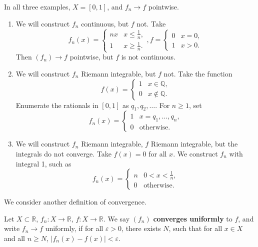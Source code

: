 \documentclass[12pt]{article}
\begin{document}
\begin{exbox}
	In all three examples, $X = [0,1]$, and $f_n \to f$ pointwise.
	\begin{enumerate}[1.]
		\item We will construct $f_n$ continuous, but $f$ not. Take
			\[
				f_n(x) =
				\begin{cases}
					nx & x \leq \frac{1}{n}, \\
					1 & x \geq \frac{1}{n}.
				\end{cases},
				f =
				\begin{cases}
					0 & x = 0, \\
					1 & x > 0.
				\end{cases}
			\]
			Then $(f_n) \to f$ pointwise, but $f$ is not continuous.
		\item We will construct $f_n$ Riemann integrable, but $f$ not. Take the function
			\[
				f(x) =
				\begin{cases}
					1 & x \in \mathbb{Q}, \\
					0 & x \not \in \mathbb{Q}.
				\end{cases}
			\]
			Enumerate the rationals in $[0,1]$ as $q_1, q_2, \ldots$. For $n \geq 1$, set
			\[
				f_n(x) =
				\begin{cases}
					1 & x = q_1, \ldots, q_n, \\
					0 & \text{otherwise}.
				\end{cases}	
			\]
		\item We will construct $f_n$ Riemann integrable, $f$ Riemann integrable, but the integrals do not converge. Take $f(x) = 0$ for all $x$. We construct $f_n$ with integral 1, such as
			\[
				f_n(x) =
				\begin{cases}
					n & 0 < x < \frac{1}{n}, \\
					0 & \text{otherwise}.
				\end{cases}
			\]
	\end{enumerate}	
\end{exbox}

We consider another definition of convergence.

\begin{definition}
	Let $X \subset \mathbb{R}$, $f_n : X \to \mathbb{R}$, $f : X \to \mathbb{R}$. We say $(f_n)$ \textbf{converges uniformly} to $f$, and write $f_n \to f$ uniformly, if for all $\varepsilon > 0$, there exists $N$, such that for all $x \in X$ and all $n \geq N$, $|f_n(x) - f(x)| < \varepsilon$.
\end{definition}
\end{document}
